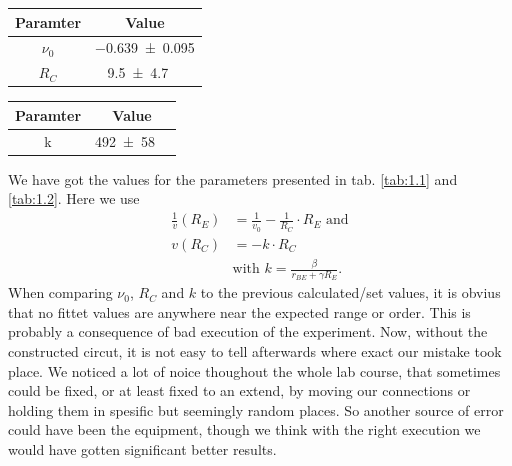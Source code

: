 \documentclass[a4paper,10pt]{article}
\newenvironment{Figure}
  {\par\medskip\noindent\minipage{\linewidth}}
  {\endminipage\par\medskip} %
\numberwithin{equation}{section}
\begin{document}
\begin{multicols}{2}
	\begin{Figure}
		\centering\resizebox{\textwidth}{!}{}
		\label{fig:rcconst}
	\end{Figure}
	\begin{Figure}
		\centering\resizebox{\textwidth}{!}{}
		\label{fig:reconst}
	\end{Figure}
	\begin{center}
		\begin{tabular}{|c|c|}
			\hline
			Paramter & Value                      \\
			\hline
			$\nu_0$  & \SI{-0.639+-0.095}{}       \\
			$R_C$    & \SI{9.5+-4.7}{\kilo\Omega} \\
			\hline
		\end{tabular}
		\label{tab:1.1}
	\end{center}
	\begin{center}
		\begin{tabular}{|c|c|}
			\hline
			Paramter & Value                                \\
			\hline
			k        & \SI{492+-58}{\micro\frac{1}{\Omega}} \\
			\hline
		\end{tabular}
		\label{tab:1.2}
	\end{center}
	We have got the values for the parameters presented in tab. \ref{tab:1.1} and \ref{tab:1.2}. Here we use
	\begin{align*}
		\frac{1}{v}(R_E) & = \frac{1}{v_0} - \frac{1}{R_C} \cdot R_E \text{ and}    \\
		v(R_C)           & = - k \cdot R_C                                          \\
		                 & \text{with }k=\frac{\beta}{r_{BE} + \gamma R_E} \text{.}
	\end{align*}
	When comparing $\nu_0$, $R_C$ and $k$ to the previous calculated/set values, it is obvius that no fittet values are anywhere near the expected range or order. This is probably a consequence of bad execution of the experiment. Now, without the constructed circut, it is not easy to tell afterwards where exact our mistake took place. We noticed a lot of noice thoughout the whole lab course, that sometimes could be fixed, or at least fixed to an extend, by moving our connections or holding them in spesific but seemingly random places. So another source of error could have been the equipment, though we think with the right execution we would have gotten significant better results.


\end{multicols}
\end{document}
